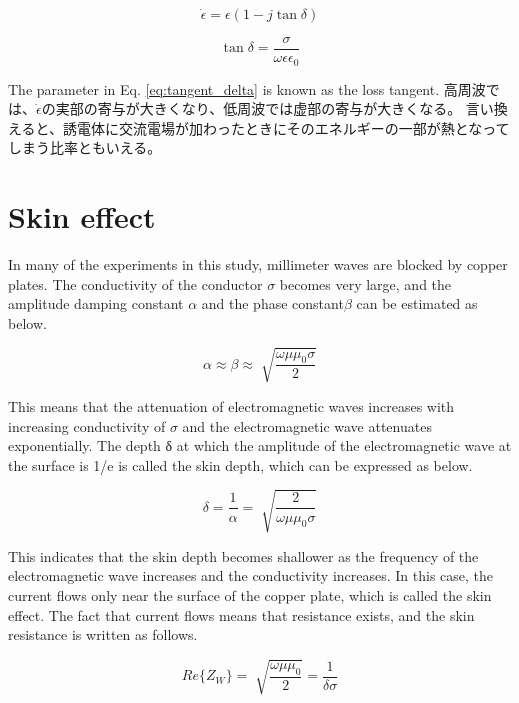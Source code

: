 \documentclass[a4paper,11pt]{jsarticle}
\begin{document}
\begin{equation} \label{eq:epsilon_dot}
  \dot{\epsilon} = \epsilon (1 - j\tan\delta)
\end{equation}

\begin{equation} \label{eq:tangent_delta}
  \tan \delta = \frac{\sigma}{\omega\epsilon\epsilon_0}
\end{equation}

The parameter in Eq. \ref{eq:tangent_delta} is known as the loss tangent.
高周波では、$\dot{\epsilon}$の実部の寄与が大きくなり、低周波では虚部の寄与が大きくなる。
言い換えると、誘電体に交流電場が加わったときにそのエネルギーの一部が熱となってしまう比率ともいえる。

\section{Skin effect}

In many of the experiments in this study, 
millimeter waves are blocked by copper plates.
The conductivity of the conductor $\sigma$ becomes very large,
and the amplitude damping constant $\alpha$ and the phase constant$\beta$
can be estimated as below.

\begin{equation}
  \alpha \approx \beta \approx \sqrt[]{\frac{\omega\mu\mu_0\sigma}{2}}
\end{equation}

This means that the attenuation of electromagnetic waves increases with increasing conductivity of $\sigma$
and the electromagnetic wave attenuates exponentially.
The depth δ at which the amplitude of the electromagnetic wave
at the surface is 1/e is called the skin depth, which can be expressed as below.

\begin{equation}
  \delta = \frac{1}{\alpha} = \sqrt[]{\frac{2}{\omega\mu\mu_0\sigma}}
\end{equation}

This indicates that the skin depth becomes shallower
as the frequency of the electromagnetic wave increases and the conductivity increases.
In this case, the current flows only near the surface of the copper plate,
which is called the skin effect.
The fact that current flows means that resistance exists,
and the skin resistance is written as follows.

\begin{equation}
  Re\{Z_W\} = \sqrt[]{\frac{\omega\mu\mu_0}{2}} = \frac{1}{\delta\sigma}
\end{equation}
\end{document}

